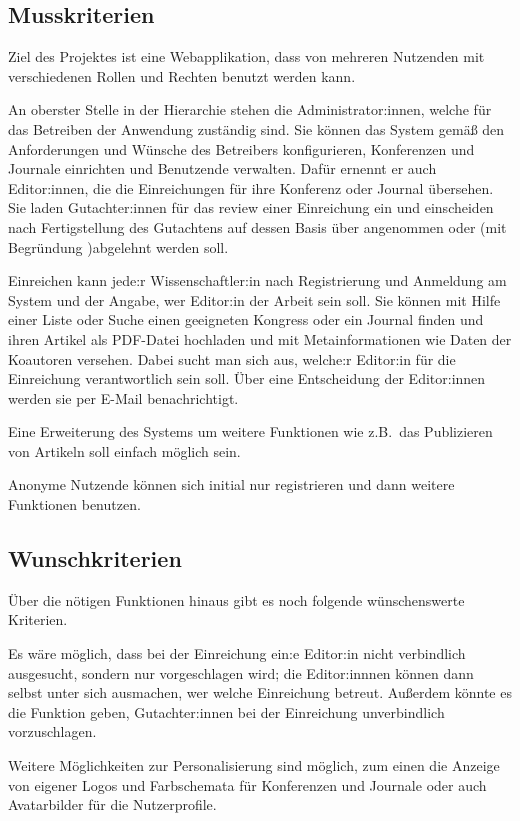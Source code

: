 
\subsection{Musskriterien}
Ziel des Projektes ist eine Webapplikation, dass von mehreren Nutzenden mit verschiedenen Rollen und Rechten benutzt werden kann.

An oberster Stelle in der Hierarchie stehen die Administrator:innen, welche für das Betreiben der Anwendung zuständig sind.
Sie können das System gemäß den Anforderungen und Wünsche des Betreibers konfigurieren, Konferenzen und Journale einrichten und Benutzende verwalten.
Dafür ernennt er auch Editor:innen, die die Einreichungen für ihre Konferenz oder Journal übersehen.
Sie laden Gutachter:innen für das review einer Einreichung ein und einscheiden nach Fertigstellung des Gutachtens auf dessen Basis über angenommen oder (mit Begründung )abgelehnt werden soll.

Einreichen kann jede:r Wissenschaftler:in nach Registrierung und Anmeldung am System und der Angabe, wer Editor:in der Arbeit sein soll.
Sie können mit Hilfe einer Liste oder Suche einen geeigneten Kongress oder ein Journal finden und ihren Artikel als PDF-Datei hochladen und mit Metainformationen wie Daten der Koautoren versehen.
Dabei sucht man sich aus, welche:r Editor:in für die Einreichung verantwortlich sein soll.
Über eine Entscheidung der Editor:innen werden sie per E-Mail benachrichtigt.

Eine Erweiterung des Systems um weitere Funktionen wie z.B.\ das Publizieren von Artikeln soll einfach möglich sein.

Anonyme Nutzende können sich initial nur registrieren und dann weitere Funktionen benutzen.

\subsection{Wunschkriterien}

Über die nötigen Funktionen hinaus gibt es noch folgende wünschenswerte Kriterien.

Es wäre möglich, dass bei der Einreichung ein:e Editor:in nicht verbindlich ausgesucht, sondern nur vorgeschlagen wird;
die Editor:innnen können dann selbst unter sich ausmachen, wer welche Einreichung betreut.
Außerdem könnte es die Funktion geben, Gutachter:innen bei der Einreichung unverbindlich vorzuschlagen.

Weitere Möglichkeiten zur Personalisierung sind möglich, zum einen die Anzeige von eigener Logos und Farbschemata für Konferenzen und Journale oder auch Avatarbilder für die Nutzerprofile.

